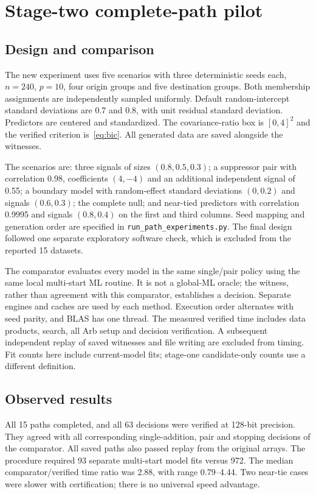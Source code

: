 \documentclass[11pt,a4paper]{article}
\theoremstyle{remark}\newtheorem{remark}[theorem]{Remark}
\begin{document}
\section{Stage-two complete-path pilot}
\subsection{Design and comparison}
The new experiment uses five scenarios with three deterministic seeds each,
$n=240$, $p=10$, four origin groups and five destination groups. Both membership
assignments are independently sampled uniformly. Default random-intercept standard
deviations are 0.7 and 0.8, with unit residual standard deviation. Predictors are
centered and standardized. The covariance-ratio box is $[0,4]^2$ and the verified
criterion is~\eqref{eq:bic}. All generated data are saved alongside the witnesses.

The scenarios are: three signals of sizes $(0.8,0.5,0.3)$; a suppressor pair
with correlation 0.98, coefficients $(4,-4)$ and an additional independent signal
of 0.55; a boundary model with random-effect standard deviations $(0,0.2)$ and
signals $(0.6,0.3)$; the complete null; and near-tied predictors with correlation
0.9995 and signals $(0.8,0.4)$ on the first and third columns. Seed mapping and
generation order are specified in \texttt{run\_path\_experiments.py}.
The final design followed one separate exploratory software check, which is
excluded from the reported 15 datasets.

The comparator evaluates every model in the same single/pair policy using the
same local multi-start ML routine. It is not a global-ML oracle; the witness,
rather than agreement with this comparator, establishes a decision. Separate
engines and caches are used by each method. Execution order alternates with seed
parity, and BLAS has one thread. The measured verified time includes data products,
search, all Arb setup and decision verification. A subsequent independent replay
of saved witnesses and file writing are excluded from timing. Fit counts here
include current-model fits; stage-one candidate-only counts use a different definition.

\subsection{Observed results}

All 15 paths completed, and all 63 decisions were verified at 128-bit precision.
They agreed with all corresponding single-addition, pair and stopping decisions
of the comparator. All saved paths also passed replay from the original arrays.
The procedure required 93 separate multi-start model fits versus 972. The median
comparator/verified time ratio was 2.88, with range 0.79--4.44. Two near-tie cases
were slower with certification; there is no universal speed advantage.
\end{document}
